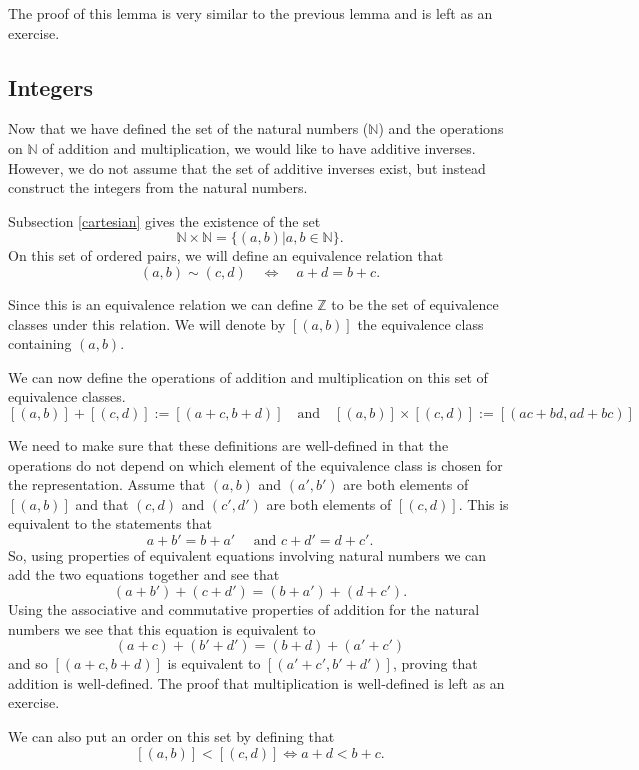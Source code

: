 \documentclass[
]{book}
\theoremstyle{definition}
\theoremstyle{definition}
\theoremstyle{definition}
\theoremstyle{definition}
\theoremstyle{remark}
\begin{document}
The proof of this lemma is very similar to the previous lemma and is left as an exercise.

\hypertarget{integers}{%
\subsection{Integers}\label{integers}}

Now that we have defined the set of the natural numbers (\(\mathbb{N}\)) and the operations on \(\mathbb{N}\) of addition and multiplication, we would like to have additive inverses. However, we do not assume that the set of additive inverses exist, but instead construct the integers from the natural numbers.

Subsection \ref{cartesian} gives the existence of the set \[\mathbb{N}\times \mathbb{N} = \{ (a,b)  \vert a,b \in \mathbb{N}\}.\] On this set of ordered pairs, we will define an equivalence relation that
\[(a,b)\sim (c,d) \quad \Leftrightarrow \quad  a+d=b+c.\]

Since this is an equivalence relation we can define \(\mathbb{Z}\) to be the set of equivalence classes under this relation. We will denote by \([(a,b)]\) the equivalence class containing \((a,b)\).

We can now define the operations of addition and multiplication on this set of equivalence classes.
\[[(a,b)]+[(c,d)]:= [(a+c,b+d)] \quad \mbox{and} \quad [(a,b)]\times [(c,d)] := [(ac+bd,ad+bc)]\]

We need to make sure that these definitions are well-defined in that the operations do not depend on which element of the equivalence class is chosen for the representation. Assume that \((a,b)\) and \((a',b')\) are both elements of \([(a,b)]\) and that \((c,d)\) and \((c',d')\) are both elements of \([(c,d)]\). This is equivalent to the statements that \[a+b'=b+a' \quad \mbox{ and } c+d'=d+c'.\] So, using properties of equivalent equations involving natural numbers we can add the two equations together and see that \[(a+b') + (c+d') = (b+a')+(d+c').\] Using the associative and commutative properties of addition for the natural numbers we see that this equation is equivalent to \[(a+c) + (b'+d') = (b+d) + (a'+c')\] and so \([(a+c,b+d)]\) is equivalent to \([(a'+c',b'+d')]\), proving that addition is well-defined. The proof that multiplication is well-defined is left as an exercise.

We can also put an order on this set by defining that \[[(a,b)] < [(c,d)] \Leftrightarrow a+d<b+c.\]
\end{document}
